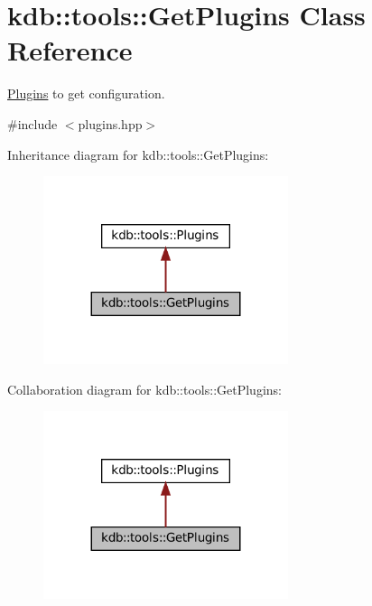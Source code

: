 \hypertarget{classkdb_1_1tools_1_1GetPlugins}{}\section{kdb\+::tools\+::Get\+Plugins Class Reference}
\label{classkdb_1_1tools_1_1GetPlugins}


\mbox{\hyperlink{classkdb_1_1tools_1_1Plugins}{Plugins}} to get configuration.  




{\ttfamily \#include $<$plugins.\+hpp$>$}



Inheritance diagram for kdb\+::tools\+::Get\+Plugins\+:
\nopagebreak
\begin{figure}[H]
\begin{center}
\leavevmode
\includegraphics[width=203pt]{classkdb_1_1tools_1_1GetPlugins__inherit__graph}
\end{center}
\end{figure}


Collaboration diagram for kdb\+::tools\+::Get\+Plugins\+:
\nopagebreak
\begin{figure}[H]
\begin{center}
\leavevmode
\includegraphics[width=203pt]{classkdb_1_1tools_1_1GetPlugins__coll__graph}
\end{center}
\end{figure}

